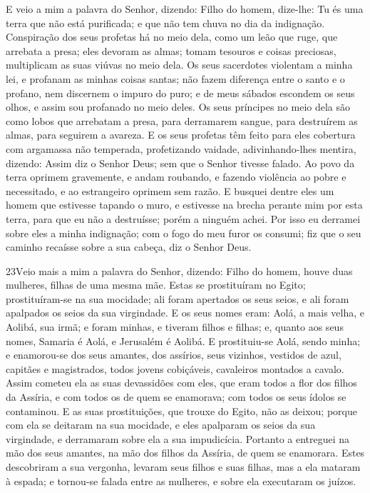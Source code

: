 E veio a mim a palavra do Senhor, dizendo: Filho do homem,
dize-lhe: Tu és uma terra que não está purificada; e que não tem
chuva no dia da indignação. Conspiração dos seus profetas há
no meio dela, como um leão que ruge, que arrebata a presa; eles
devoram as almas; tomam tesouros e coisas preciosas, multiplicam as
suas viúvas no meio dela. Os seus sacerdotes violentam a
minha lei, e profanam as minhas coisas santas; não fazem diferença
entre o santo e o profano, nem discernem o impuro do puro; e de meus
sábados escondem os seus olhos, e assim sou profanado no meio deles.
Os seus príncipes no meio dela são como lobos que arrebatam a
presa, para derramarem sangue, para destruírem as almas, para
seguirem a avareza. E os seus profetas têm feito para eles
cobertura com argamassa não temperada, profetizando vaidade,
adivinhando-lhes mentira, dizendo: Assim diz o Senhor Deus; sem que
o Senhor tivesse falado. Ao povo da terra oprimem gravemente,
e andam roubando, e fazendo violência ao pobre e necessitado, e ao
estrangeiro oprimem sem razão. E busquei dentre eles um homem
que estivesse tapando o muro, e estivesse na brecha perante mim por
esta terra, para que eu não a destruísse; porém a ninguém achei.
Por isso eu derramei sobre eles a minha indignação; com o
fogo do meu furor os consumi; fiz que o seu caminho recaísse sobre a
sua cabeça, diz o Senhor Deus.

\medskip

\lettrine{23} Veio mais a mim a palavra do Senhor, dizendo:
Filho do homem, houve duas mulheres, filhas de uma mesma mãe.
Estas se prostituíram no Egito; prostituíram-se na sua mocidade;
ali foram apertados os seus seios, e ali foram apalpados os seios da
sua virgindade. E os seus nomes eram: Aolá, a mais velha, e
Aolibá, sua irmã; e foram minhas, e tiveram filhos e filhas; e,
quanto aos seus nomes, Samaria é Aolá, e Jerusalém é Aolibá. E
prostituiu-se Aolá, sendo minha; e enamorou-se dos seus amantes, dos
assírios, seus vizinhos, vestidos de azul, capitães e
magistrados, todos jovens cobiçáveis, cavaleiros montados a cavalo.
Assim cometeu ela as suas devassidões com eles, que eram todos a
flor dos filhos da Assíria, e com todos os de quem se enamorava; com
todos os seus ídolos se contaminou. E as suas prostituições, que
trouxe do Egito, não as deixou; porque com ela se deitaram na sua
mocidade, e eles apalparam os seios da sua virgindade, e derramaram
sobre ela a sua impudicícia. Portanto a entreguei na mão dos
seus amantes, na mão dos filhos da Assíria, de quem se enamorara.
Estes descobriram a sua vergonha, levaram seus filhos e suas
filhas, mas a ela mataram à espada; e tornou-se falada entre as
mulheres, e sobre ela executaram os juízos.

